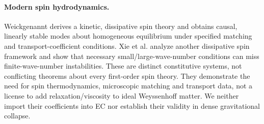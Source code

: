 \paragraph{Modern spin hydrodynamics.} Weickgenannt \cite{Weick} derives a kinetic, dissipative spin theory and obtains causal, linearly stable modes about homogeneous equilibrium under specified matching and transport-coefficient conditions. Xie et al. \cite{Xie} analyze another dissipative spin framework and show that necessary small/large-wave-number conditions can miss finite-wave-number instabilities. These are distinct constitutive systems, not conflicting theorems about every first-order spin theory. They demonstrate the need for spin thermodynamics, microscopic matching and transport data, not a license to add relaxation/viscosity to ideal Weyssenhoff matter. We neither import their coefficients into EC nor establish their validity in dense gravitational collapse.

